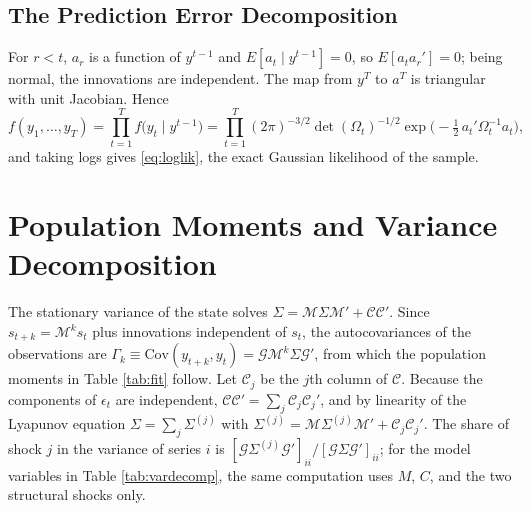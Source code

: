 \documentclass[12pt]{article}
\begin{document}
\subsection{The Prediction Error Decomposition}\label{app:ped}

For $r < t$, $a_r$ is a function of $y^{t-1}$ and $E[a_t \mid y^{t-1}] = 0$, so $E[a_t a_r'] = 0$; being normal, the innovations are independent. The map from $y^{T}$ to $a^{T}$ is triangular with unit Jacobian. Hence
\[
  f(y_1, \dots, y_T) = \prod_{t=1}^{T} f\big(y_t \mid y^{t-1}\big)
  = \prod_{t=1}^{T} (2\pi)^{-3/2} \det(\Omega_t)^{-1/2} \exp\!\Big(-\tfrac12\, a_t'\Omega_t^{-1}a_t\Big) ,
\]
and taking logs gives \eqref{eq:loglik}, the exact Gaussian likelihood of the sample.

\section{Population Moments and Variance Decomposition}\label{app:moments}

The stationary variance of the state solves $\Sigma = \mathcal{M}\Sigma\mathcal{M}' + \mathcal{C}\mathcal{C}'$. Since $s_{t+k} = \mathcal{M}^{k}s_t$ plus innovations independent of $s_t$, the autocovariances of the observations are $\Gamma_k \equiv \mathrm{Cov}(y_{t+k}, y_t) = \mathcal{G}\mathcal{M}^{k}\Sigma\mathcal{G}'$, from which the population moments in Table \ref{tab:fit} follow. Let $\mathcal{C}_j$ be the $j$th column of $\mathcal{C}$. Because the components of $\epsilon_t$ are independent, $\mathcal{C}\mathcal{C}' = \sum_j \mathcal{C}_j\mathcal{C}_j'$, and by linearity of the Lyapunov equation $\Sigma = \sum_j \Sigma^{(j)}$ with $\Sigma^{(j)} = \mathcal{M}\Sigma^{(j)}\mathcal{M}' + \mathcal{C}_j\mathcal{C}_j'$. The share of shock $j$ in the variance of series $i$ is $[\mathcal{G}\Sigma^{(j)}\mathcal{G}']_{ii}/[\mathcal{G}\Sigma\mathcal{G}']_{ii}$; for the model variables in Table \ref{tab:vardecomp}, the same computation uses $M$, $C$, and the two structural shocks only.
\end{document}
